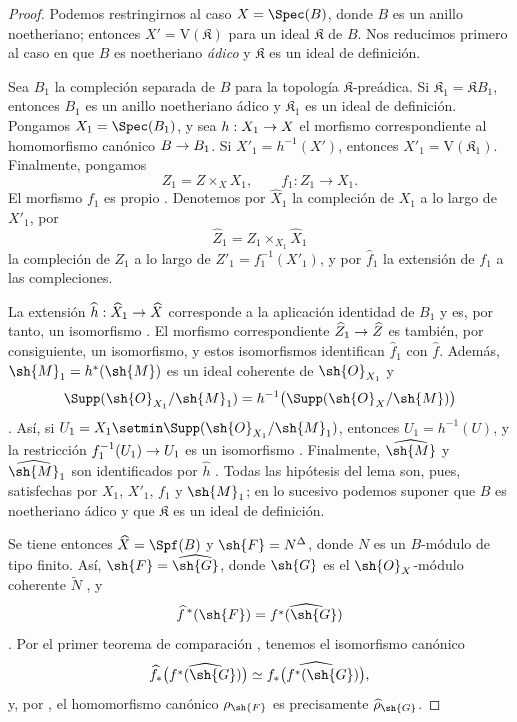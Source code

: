 \documentclass[oneside]{amsart}
\makeatletter
\newcommand{\ega@arrow}[2]{\mathchoice{#1}{#2}{#2}{#2}}
\renewcommand{\to}{\ega@arrow{\longrightarrow}{\rightarrow}}
\newcommand{\oldpage}[2][]{{\marginnote{\normalfont\textbf{#1}~|~#2}}\ignorespaces}
\makeatother
\begin{document}
\begin{proof}
Podemos restringirnos al caso $X=\Spec(B)$, donde $B$ es un
anillo noetheriano; entonces $X'=\mathrm{V}(\mathfrak{K})$ para un ideal
$\mathfrak{K}$ de $B$. Nos reducimos primero al caso en que $B$ es
noetheriano \emph{ádico} y $\mathfrak{K}$ es un ideal de definición.

Sea $B_1$ la compleción separada de $B$ para la
topología $\mathfrak{K}$-preádica.
\oldpage[III]{155}
Si $\mathfrak{K}_1=\mathfrak{K}B_1$, entonces $B_1$ es un anillo
noetheriano ádico y $\mathfrak{K}_1$ es un ideal de definición.
Pongamos $X_1=\Spec(B_1)$, y sea $h:X_1\to X$ el morfismo
correspondiente al homomorfismo canónico $B\to B_1$. Si
$X'_1=h^{-1}(X')$, entonces $X'_1=\mathrm{V}(\mathfrak{K}_1)$. Finalmente,
pongamos
\[
  Z_1=Z\times_X X_1,\qquad f_1:Z_1\longrightarrow X_1.
\]
El morfismo $f_1$ es propio . Denotemos por
$\widehat{X}_1$ la compleción de $X_1$ a lo largo de $X'_1$, por
\[
  \widehat{Z}_1=
  Z_1\times_{X_1}\widehat{X}_1
\]
la compleción de $Z_1$ a lo largo de
$Z'_1=f_1^{-1}(X'_1)$, y por
$\widehat{f}_1$ la extensión de $f_1$ a las compleciones.

La extensión
$\widehat{h}:\widehat{X}_1\to\widehat{X}$ corresponde a la
aplicación identidad de $B_1$ y es, por tanto, un isomorfismo
. El morfismo correspondiente
$\widehat{Z}_1\to\widehat{Z}$ es también, por consiguiente, un isomorfismo,
y estos isomorfismos identifican $\widehat{f}_1$ con
$\widehat{f}$. Además,
$\sh{M}_1=h^*(\sh{M})$ es un ideal coherente de $\sh{O}_{X_1}$ y
\[
  \Supp(\sh{O}_{X_1}/\sh{M}_1)
  =h^{-1}\bigl(\Supp(\sh{O}_X/\sh{M})\bigr)
\]
. Así, si
$U_1=X_1\setmin\Supp(\sh{O}_{X_1}/\sh{M}_1)$, entonces
$U_1=h^{-1}(U)$, y la restricción
$f_1^{-1}(U_1)\to U_1$ es un isomorfismo
. Finalmente, $\widehat{\sh{M}}$ y
$\widehat{\sh{M}}_1$ son identificados por $\widehat{h}$
. Todas las hipótesis del lema son, pues,
satisfechas por $X_1$, $X'_1$, $f_1$ y $\sh{M}_1$; en lo sucesivo
podemos suponer que $B$ es noetheriano ádico y que $\mathfrak{K}$ es
un ideal de definición.

Se tiene entonces $\widehat{X}=\Spf(B)$ y
$\sh{F}=N^\Delta$, donde $N$ es un $B$-módulo de tipo finito. Así,
$\sh{F}=\widehat{\sh{G}}$, donde $\sh{G}$ es el
$\sh{O}_X$-módulo coherente $\widetilde{N}$ , y
\[
  \widehat{f}^{\,*}(\sh{F})
  =\widehat{f^*(\sh{G})}
\]
. Por el primer teorema de comparación
, tenemos el isomorfismo canónico
\[
  \widehat{f}_*
  \bigl(\widehat{f^*(\sh{G})}\bigr)
  \simeq
  \widehat{f_*\bigl(f^*(\sh{G})\bigr)},
\]
y, por , el homomorfismo canónico
$\rho_{\sh{F}}$ es precisamente $\widehat{\rho}_{\sh{G}}$.


\end{proof}
\end{document}
